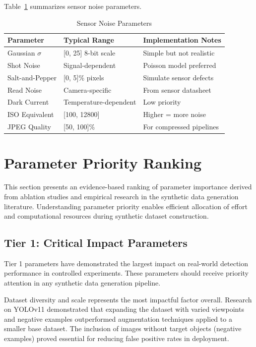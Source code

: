 Table~\ref{tab:noise_params} summarizes sensor noise parameters.

\begin{table}[htbp]
\centering
\caption{Sensor Noise Parameters}
\label{tab:noise_params}
\begin{tabular}{p{3.5cm}p{3cm}p{5cm}}
\hline
\textbf{Parameter} & \textbf{Typical Range} & \textbf{Implementation Notes} \\
\hline
Gaussian $\sigma$ & [0, 25] 8-bit scale & Simple but not realistic \\
Shot Noise & Signal-dependent & Poisson model preferred \\
Salt-and-Pepper & [0, 5]\% pixels & Simulate sensor defects \\
Read Noise & Camera-specific & From sensor datasheet \\
Dark Current & Temperature-dependent & Low priority \\
ISO Equivalent & [100, 12800] & Higher = more noise \\
JPEG Quality & [50, 100]\% & For compressed pipelines \\
\hline
\end{tabular}
\end{table}

\section{Parameter Priority Ranking}
\label{sec:priority_ranking}

This section presents an evidence-based ranking of parameter importance derived from ablation studies and empirical research in the synthetic data generation literature. Understanding parameter priority enables efficient allocation of effort and computational resources during synthetic dataset construction.

\subsection{Tier 1: Critical Impact Parameters}

Tier 1 parameters have demonstrated the largest impact on real-world detection performance in controlled experiments. These parameters should receive priority attention in any synthetic data generation pipeline.

Dataset diversity and scale represents the most impactful factor overall. Research on YOLOv11 demonstrated that expanding the dataset with varied viewpoints and negative examples outperformed augmentation techniques applied to a smaller base dataset. The inclusion of images without target objects (negative examples) proved essential for reducing false positive rates in deployment.


